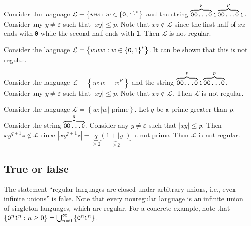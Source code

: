 \documentclass{notes}
\begin{document}
\begin{eg}
  Consider the language $\mathcal L = \left \{ ww : w \in \left \{ \verb~0~, \verb~1~ \right \}^* \right \}$ and the string $\overbrace{\verb~00...0~}^{p} \verb~1~ \overbrace{\verb~00...0~}^{p} \verb~1~$.
  Consider any $y \neq \varepsilon$ such that $\left | x y \right | \leq p$.
  Note that $x z \not \in \mathcal L$ since the first half of $x z$ ends with \verb~0~ while the second half ends with \verb~1~.
  Then $\mathcal L$ is not regular.
\end{eg}

\begin{eg}
  Consider the language $\mathcal L = \left \{ www : w \in \left \{ \verb~0~, \verb~1~ \right \}^* \right \}$.
  It can be shown that this is not regular.
\end{eg}

\newpage

\begin{eg}
  Consider the language $\mathcal L = \left \{ w : w = w^R \right \}$ and the string $\overbrace{\verb~00...0~}^{p} \verb~1~ \overbrace{\verb~00...0~}^{p}$.
  Consider any $y \neq \varepsilon$ such that $\left | x y \right | \leq p$.
  Note that $x z \not \in \mathcal L$.
  Then $\mathcal L$ is not regular.
\end{eg}

\begin{eg}
  Consider the language $\mathcal L = \left \{ w : \text{$\left | w \right |$ prime} \right \}$.
  Let $q$ be a prime greater than $p$.
  Consider the string $\overbrace{\verb~00...0~}^{q}$.
  Consider any $y \neq \varepsilon$ such that $\left | x y \right | \leq p$.
  Then $x y^{q + 1} z \not \in \mathcal L$ since $\left | x y^{q + 1} z \right | = \underbrace{q}_{\geq 2} \underbrace{(1 + \left | y \right |)}_{\geq 2}$ is not prime.
  Then $\mathcal L$ is not regular. 
\end{eg}

\newpage

\subsection{True or false}

\begin{eg}
  The statement ``regular languages are closed under arbitrary unions, i.e., even infinite unions'' is false.
  Note that every nonregular language is an infinite union of singleton languages, which are regular.
  For a concrete example, note that $\left \{ \verb~0~^n \verb~1~^n : n \geq 0 \right \} = \bigcup_{n = 0}^\infty \left \{ \verb~0~^n \verb~1~^n \right \}$.
\end{eg}
\end{document}
